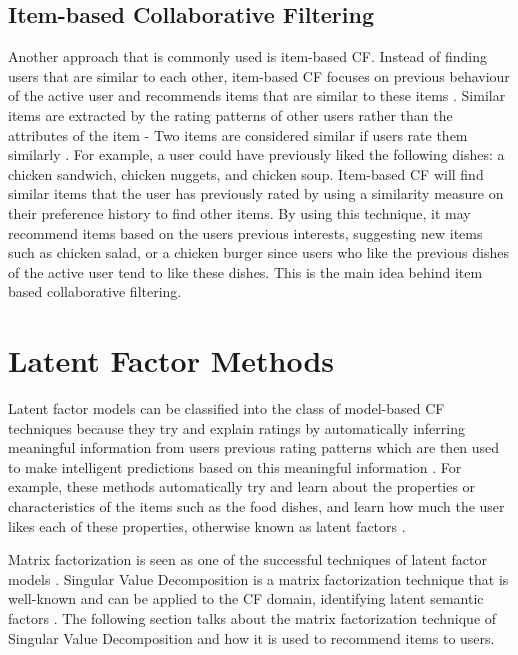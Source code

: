 \subsection{Item-based Collaborative Filtering}

Another approach that is commonly used is item-based CF. Instead of finding users that are similar to each other, item-based CF focuses on previous behaviour of the active user and recommends items that are similar to these items \cite{mahoutaction}. Similar items are extracted by the rating patterns of other users rather than the attributes of the item - Two items are considered similar if users rate them similarly \cite{schafer2007collaborative}. For example, a user could have previously liked the following dishes: a chicken sandwich, chicken nuggets, and chicken soup. Item-based CF will find similar items that the user has previously rated by using a similarity measure on their preference history to find other items. By using this technique, it may recommend items based on the users previous interests, suggesting new items such as chicken salad, or a chicken burger since users who like the previous dishes of the active user tend to like these dishes. This is the main idea behind item based collaborative filtering. 


\section{Latent Factor Methods}



Latent factor models can be classified into the class of model-based CF techniques because they try and explain ratings by automatically inferring meaningful information from users previous rating patterns which are then used to make intelligent predictions based on this meaningful information \cite{survey}. For example, these methods automatically try and learn about the properties or characteristics of the items such as the food dishes, and learn how much the user likes each of these properties, otherwise known as latent factors \cite{koren2011}. 

Matrix factorization is seen as one of the successful techniques of latent factor models \cite{memorybased, koren2009matrix}. Singular Value Decomposition is a matrix factorization technique that is well-known and can be applied to the CF domain, identifying latent semantic factors \cite{koren2009matrix}. The following section talks about the matrix factorization technique of Singular Value Decomposition and how it is used to recommend items to users. 


